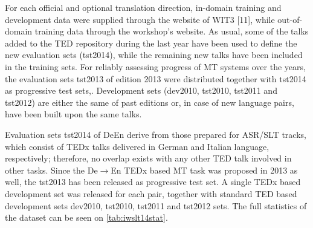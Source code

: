 For each official and optional translation direction, in-domain training and development data were supplied through the website of WIT3 [11], while out-of-domain training data through the workshop's website. As usual, some of the talks added to the TED repository during the last year have been used to define the new evaluation sets (tst2014), while the remaining new talks have been included in the training sets. For reliably assessing progress of MT systems over the years, the evaluation sets tst2013 of edition 2013 were distributed together with tst2014 as progressive test sets,. Development sets (dev2010, tst2010, tst2011 and tst2012) are either the same of past editions or, in case of new language pairs, have been built upon the same talks.

Evaluation sets tst2014 of DeEn derive from those prepared for ASR/SLT tracks, which consist of TEDx talks delivered in German and Italian language, respectively; therefore, no overlap exists with any other TED talk involved in other tasks. Since the De$\rightarrow$En TEDx based MT task was proposed in 2013 as well, the tst2013 has been released as progressive test set. A single TEDx based development set was released for each pair, together with standard TED based development sets dev2010, tst2010, tst2011 and tst2012 sets. The full statistics of the dataset can be seen on \ref{tab:iwslt14stat}.

